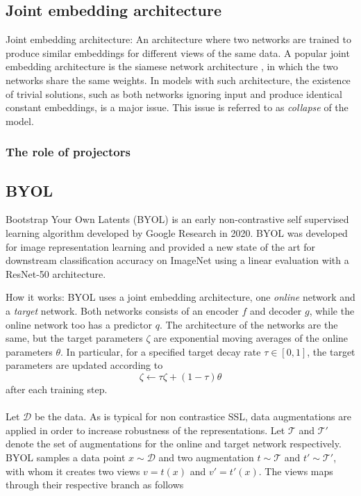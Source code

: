 \documentclass[../../thesis.tex]{subfiles}
\begin{document}
\subsection{Joint embedding architecture}

Joint embedding architecture: An architecture where two networks are trained to produce similar embeddings for different views of the same data. A popular joint embedding architecture is the siamese network architecture \cite{siamese}, in which the two networks share the same weights. In models with such architecture, the existence of trivial solutions, such as both networks ignoring input and produce identical constant embeddings, is a major issue. This issue is referred to as \textit{collapse} of the model.

\subsubsection{The role of projectors}

\subsection{BYOL}
\cite{grill2020bootstrap}
Bootstrap Your Own Latents (BYOL) is an early non-contrastive self supervised learning algorithm developed by Google Research in 2020. BYOL was developed for image representation learning and provided a new state of the art for downstream classification accuracy on ImageNet using a linear evaluation with a ResNet-50 architecture. 

How it works:
BYOL uses a joint embedding architecture, one \textit{online} network and a \textit{target} network. Both networks consists of an encoder $f$ and decoder $g$, while the online network too has a predictor $q$. The architecture of the networks are the same, but the target parameters $\zeta$ are exponential moving averages of the online parameters $\theta$. In particular, for a specified target decay rate $\tau\in[0,1]$, the target parameters are updated according to 
\begin{equation}
    \zeta \leftarrow \tau \zeta + (1-\tau)\theta
\end{equation}
after each training step. \\\\

Let $\mathcal{D}$ be the data. As is typical for non contrastice SSL, data augmentations are applied in order to increase robustness of the representations. Let $\mathcal{T}$  and $\mathcal{T'}$ denote the set of augmentations for the online and target network respectively. BYOL samples a data point $x\sim \mathcal{D}$ and two augmentation $t\sim \mathcal{T}$ and $t'\sim \mathcal{T'}$, with whom it creates two views $v = t(x)$ and $v' = t'(x)$. The views maps through their respective branch as follows
\end{document}
